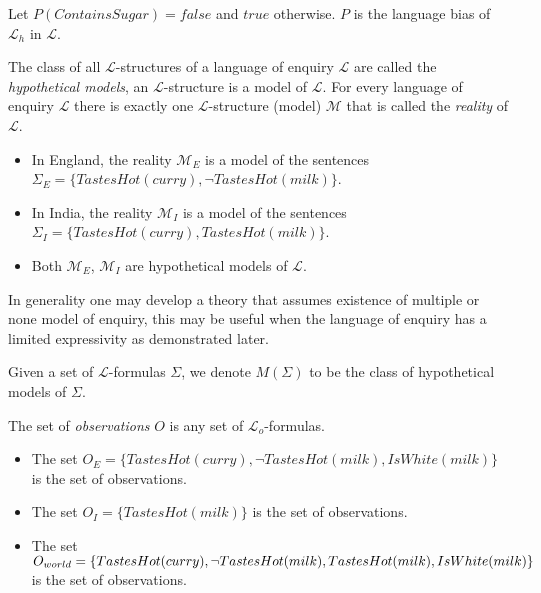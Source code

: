 \begin{exmp}
Let $P(ContainsSugar)=false$ and $true$ otherwise. $P$ is the language bias of $\mathcal{L}_h$ in $\mathcal{L}$.
\end{exmp}

\begin{defn}
The class of all $\mathcal{L}$-structures of a language of enquiry $\mathcal{L}$ are called the \emph{hypothetical models}, an $\mathcal{L}$-structure is a model of $\mathcal{L}$. For every language of enquiry $\mathcal{L}$ there is exactly one $\mathcal{L}$-structure (model) $\mathcal{M}$ that is called the \emph{reality} of $\mathcal{L}$.
\end{defn}

\begin{exmp}
\begin{itemize}
\item In England, the reality $\mathcal{M}_E$ is a model of the sentences\\ $\Sigma_E=\{TastesHot(curry), \neg TastesHot(milk)\}$.
\item In India, the reality $\mathcal{M}_I$ is a model of the sentences\\ $\Sigma_I=\{TastesHot(curry), TastesHot(milk)\}$.
\item Both $\mathcal{M}_E$, $\mathcal{M}_I$ are hypothetical models of $\mathcal{L}$.
\end{itemize}
\end{exmp}

\begin{remark}
In generality one may develop a theory that assumes existence of multiple or none model of enquiry, this may be useful when the language of enquiry has a limited expressivity as demonstrated later.
\end{remark}

\begin{notation}
Given a set of $\mathcal{L}$-formulas $\Sigma$, we denote $M(\Sigma)$ to be the class of hypothetical models of $\Sigma$.
\end{notation}

\begin{defn}
The set of \emph{observations} $O$ is any set of $\mathcal{L}_o$-formulas.
\end{defn}

\begin{exmp}
\begin{itemize}
\item The set $O_E=\{TastesHot(curry), \neg TastesHot(milk), IsWhite(milk)\}$ is the set of observations.
\item The set $O_I=\{TastesHot(milk)\}$ is the set of observations.
\item The set $O_{world}=\{TastesHot(curry), \neg TastesHot(milk), TastesHot(milk), \\
IsWhite(milk)\}$ is the set of observations.
\end{itemize}
\end{exmp}


